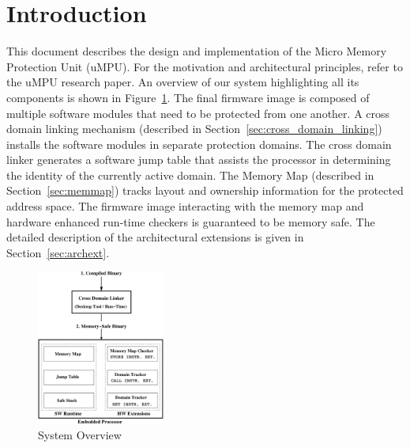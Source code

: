 \section{Introduction}
\label{sec:intro}
%
This document describes the design and implementation of the Micro Memory Protection Unit (uMPU).
%
For the motivation and architectural principles, refer to the uMPU research paper.
%
An overview of our system highlighting all its components is shown in Figure~\ref{fig:sys_overview}.
%
The final firmware image is composed of multiple software modules that need to be protected from one another.
%
%
A cross domain linking mechanism (described in Section~\ref{sec:cross_domain_linking}) installs the software modules in separate protection domains.
%
The cross domain linker generates a software jump table that assists the processor in determining the identity of the currently active domain.
%
The Memory Map (described in Section~\ref{sec:memmap}) tracks layout and ownership information for the protected address space.
%
The firmware image interacting with the memory map and hardware enhanced run-time checkers is guaranteed to be memory safe.
%
The detailed description of the architectural extensions is given in Section~\ref{sec:archext}.
%
\begin{figure}[htbp]
   \centering
   \includegraphics[height = 2.0in, keepaspectratio=true]{figures/sysoverview.pdf} 
   \caption{System Overview}
   \label{fig:sys_overview}
\end{figure}
%
